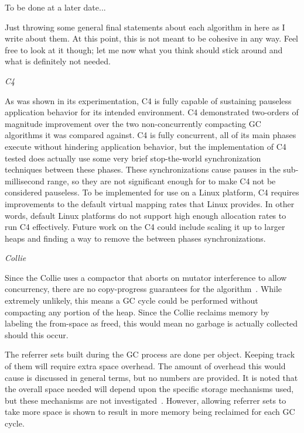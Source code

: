 \documentclass{sig-alternate}
\begin{document}
To be done at a later date...

Just throwing some general final statements about each algorithm in here as I write about
them. At this point, this is not meant to be cohesive in any way. Feel free
to look at it though; let me now what you think should stick around and what is definitely
not needed.

\emph{C4}

As was shown in its experimentation, C4 is fully capable of sustaining pauseless application
behavior for its intended environment. C4 demonstrated two-orders of magnitude improvement
over the two non-concurrently compacting GC algorithms it was compared against. C4 is
fully concurrent, all of its main phases execute without hindering application behavior,
but the implementation of C4 tested does actually use some very brief stop-the-world synchronization
techniques between these phases. These synchronizations cause pauses in the sub-millisecond range, so
they are not significant enough for to make C4 not be considered pauseless. To be 
implemented for use on a Linux platform, C4 requires improvements to the default 
virtual mapping rates that Linux provides. In other words, default Linux platforms 
do not support high enough allocation rates to run C4 effectively. Future work 
on the C4 could include scaling it up to larger heaps and 
finding a way to remove the between phases synchronizations.

\emph{Collie}

Since the Collie uses a compactor that aborts on mutator interference to allow
concurrency, there are no copy-progress guarantees for the algorithm~\cite{Osterlund:FPP}.
While extremely unlikely, this means a GC cycle could be performed without compacting
any portion of the heap. Since the Collie reclaims memory by labeling the from-space as freed,
this would mean no garbage is actually collected should this occur.

The referrer sets built during the GC process are done per object. Keeping track of them
will require extra space overhead. The amount of overhead this would cause is discussed in
general terms, but no numbers are provided. It is noted that the overall space needed will 
depend upon the specific storage mechanisms used, but these mechanisms are not 
investigated~\cite{Iyengar:Collie}. However, allowing referrer sets to take
more space is shown to result in more memory being reclaimed for each GC cycle.
\end{document}
